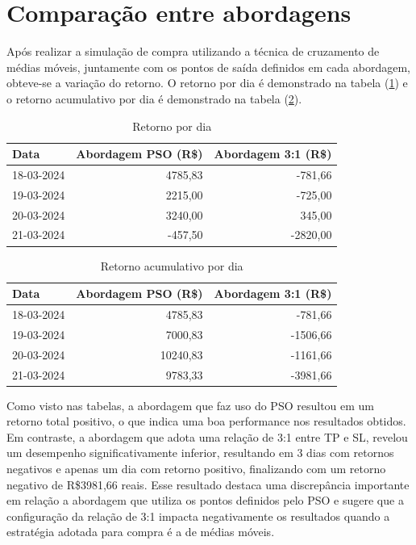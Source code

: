 \documentclass{iftex2024}
\begin{document}
\section{Comparação entre abordagens}

Após realizar a simulação de compra utilizando a técnica de cruzamento
de médias móveis, juntamente com os pontos de saída definidos em cada abordagem,
obteve-se a variação do retorno. O
retorno por dia é demonstrado na tabela (\ref{tab:retornoDia}) e o retorno acumulativo por dia é demonstrado na tabela (\ref{tab:retornoAcumulativoDia}).


\begin{table}[!htb]
  \caption{Retorno por dia} \label{tab:retornoDia}
  \begin{tabularx}{\textwidth}{X|r|r} 
  \hline
  Data     & Abordagem PSO (R\$) & Abordagem 3:1 (R\$) \\ 
  \hline
  18-03-2024 & 4785,83     & -781,66    \\
  19-03-2024 & 2215,00     & -725,00      \\
  20-03-2024 & 3240,00     & 345,00       \\ 
  21-03-2024 & -457,50     & -2820,00 \\
  \hline
  \end{tabularx}
\end{table}

\begin{table}[!htb]
  \caption{Retorno acumulativo por dia} \label{tab:retornoAcumulativoDia}
  \begin{tabularx}{\textwidth}{X|r|r} 
  \hline
  Data     & Abordagem PSO (R\$) & Abordagem 3:1 (R\$) \\ 
  \hline
  18-03-2024 & 4785,83     & -781,66    \\
  19-03-2024 & 7000,83     & -1506,66      \\
  20-03-2024 & 10240,83    & -1161,66      \\ 
  21-03-2024 & 9783,33     & -3981,66 \\
  \hline
  \end{tabularx}
\end{table}

Como visto nas tabelas, a abordagem que faz uso do PSO resultou
em um retorno total positivo, o que indica uma boa performance nos resultados obtidos. Em contraste, a abordagem
que adota uma relação de 3:1 entre TP e SL, revelou um
desempenho significativamente inferior, resultando em 3 dias com retornos negativos e apenas um dia
com retorno positivo, finalizando com um retorno negativo de R\$3981,66 reais. Esse
resultado destaca uma discrepância importante em relação a abordagem que utiliza os pontos definidos pelo PSO e sugere
que a configuração da relação de 3:1 impacta negativamente os resultados quando a estratégia
adotada para compra é a de médias móveis. 
\end{document}
